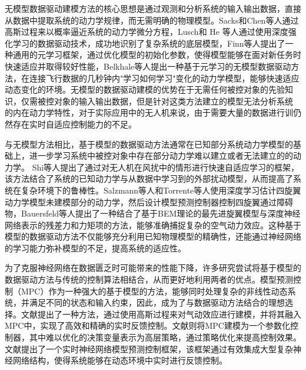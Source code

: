 \documentclass[lang=chs, degree=master, blindreview=true, winfonts=true]{yanputhesis}
\begin{document}
无模型数据驱动建模方法的核心思想是通过观测和分析系统的输入输出数据，直接从数据中提取系统的动力学规律，而无需明确的物理模型。Sacks和Chen等人\cite{sacks2023learning,chen2022gaussian}通过高斯过程来以概率逼近系统的动力学微分方程，Lusch和 He 等人\cite{lusch2018deep,hewing2019cautious}通过使用深度强化学习的数据驱动技术，成功地识别了复杂系统的底层模型，Finn等人\cite{finn2017model}提出了一种通用的元学习框架，通过优化模型的初始化参数，使得模型能够在面对新任务时快速适应并取得较好性能，Belkhale等人\cite{belkhale2021model}提出一种基于元学习的无模型数据驱动方法，在连接飞行数据的几秒钟内"学习如何学习"变化的动力学模型，能够快速适应动态变化的环境。无模型的数据驱动建模的优势在于无需任何被控对象的先验知识，仅需被控对象的输入输出数据，但是针对这类方法建立的模型无法分析系统 的内在动力学特性，对于实际应用中的无人机来说，由于需要大量的数据进行训仍然存在实时自适应控制能力的不足。


与无模型方法相比，基于模型的数据驱动方法通常在已知部分系统动力学模型的基础上，进一步学习系统中被控对象中存在部分动力学难以建立或者无法建立的的动力学。
Shi等人\cite{o2022neural}提出了通过对无人机在风扰中的情形进行快速自适应学习的框架，该方法结合了系统的已知动力学与从数据中学习到的外部扰动模型，从而提高了系统在复杂环境下的鲁棒性。Salzmann等人\cite{salzmann2023real}和Torrente等人\cite{torrente2021data}使用深度学习估计四旋翼动力学模型未建模部分的动力学，然后设计模型预测控制器控制四旋翼通过障碍物，Bauersfeld等人\cite{Bauersfeld2021}提出了一种结合了基于BEM理论的最先进旋翼模型与深度神经网络表示的残差力和力矩项的方法，能够准确捕捉复杂的空气动力效应。这种基于模型的数据驱动方法不仅能够充分利用已知物理模型的精确性，还能通过神经网络的学习能力弥补模型的不足，提高系统的适应性。

为了克服神经网络在数据匮乏时可能带来的性能下降，许多研究尝试将基于模型的数据驱动方法与传统的控制算法相结合，从而更好地利用两者的优点。模型预测控制（MPC）作为一种强大的基于模型的方法，能够同时处理复杂的非线性动态系统，并满足不同的状态和输入约束\cite{neunert2016fast}，因此，成为了与数据驱动方法结合的理想选择。文献提出了一种方法，通过使用高斯过程来对气动效应进行建模，并将其融入MPC中，实现了高效和精确的实时反馈控制。文献则将MPC建模为一个参数化控制器，其中难以优化的决策变量表示为高层策略，通过策略优化来提高控制效果。文献提出了一个实时神经网络模型预测控制框架，该框架通过有效集成大型复杂神经网络结构，使得系统能够在动态环境中实时进行反馈控制。

\end{document}
